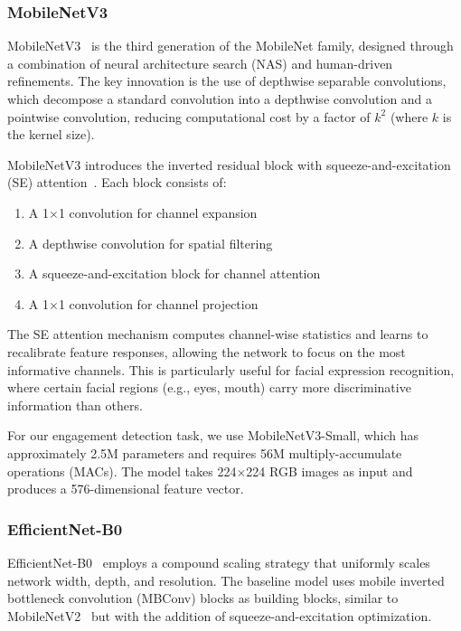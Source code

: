 \documentclass[sensors,article,submit,pdftex,moreauthors]{Definitions/mdpi}
\begin{document}
\subsubsection{MobileNetV3}

MobileNetV3~\cite{howard2019mobilenetv3} is the third generation of the MobileNet family, designed through a combination of neural architecture search (NAS) and human-driven refinements. The key innovation is the use of depthwise separable convolutions, which decompose a standard convolution into a depthwise convolution and a pointwise convolution, reducing computational cost by a factor of $k^2$ (where $k$ is the kernel size).

MobileNetV3 introduces the inverted residual block with squeeze-and-excitation (SE) attention~\cite{howard2019mobilenetv3}. Each block consists of:
\begin{enumerate}
\item A 1$\times$1 convolution for channel expansion
\item A depthwise convolution for spatial filtering
\item A squeeze-and-excitation block for channel attention
\item A 1$\times$1 convolution for channel projection
\end{enumerate}

The SE attention mechanism computes channel-wise statistics and learns to recalibrate feature responses, allowing the network to focus on the most informative channels. This is particularly useful for facial expression recognition, where certain facial regions (e.g., eyes, mouth) carry more discriminative information than others.

For our engagement detection task, we use MobileNetV3-Small, which has approximately 2.5M parameters and requires 56M multiply-accumulate operations (MACs). The model takes 224$\times$224 RGB images as input and produces a 576-dimensional feature vector.

\subsubsection{EfficientNet-B0}

EfficientNet-B0~\cite{tan2019efficientnet} employs a compound scaling strategy that uniformly scales network width, depth, and resolution. The baseline model uses mobile inverted bottleneck convolution (MBConv) blocks as building blocks, similar to MobileNetV2~\cite{sandler2018mobilenetv2} but with the addition of squeeze-and-excitation optimization.
\end{document}

